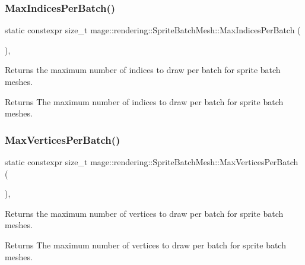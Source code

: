 \subsubsection{\texorpdfstring{Max\+Indices\+Per\+Batch()}{MaxIndicesPerBatch()}}
{\footnotesize\ttfamily static constexpr size\+\_\+t mage\+::rendering\+::\+Sprite\+Batch\+Mesh\+::\+Max\+Indices\+Per\+Batch (\begin{DoxyParamCaption}{ }\end{DoxyParamCaption})\hspace{0.3cm}{\ttfamily [static]}, {\ttfamily [noexcept]}}

Returns the maximum number of indices to draw per batch for sprite batch meshes.

\begin{DoxyReturn}{Returns}
The maximum number of indices to draw per batch for sprite batch meshes. 
\end{DoxyReturn}
\mbox{\label{classmage_1_1rendering_1_1_sprite_batch_mesh_adad10e43a3ac2fb393bb423ec71c69bf}} 
\subsubsection{\texorpdfstring{Max\+Vertices\+Per\+Batch()}{MaxVerticesPerBatch()}}
{\footnotesize\ttfamily static constexpr size\+\_\+t mage\+::rendering\+::\+Sprite\+Batch\+Mesh\+::\+Max\+Vertices\+Per\+Batch (\begin{DoxyParamCaption}{ }\end{DoxyParamCaption})\hspace{0.3cm}{\ttfamily [static]}, {\ttfamily [noexcept]}}

Returns the maximum number of vertices to draw per batch for sprite batch meshes.

\begin{DoxyReturn}{Returns}
The maximum number of vertices to draw per batch for sprite batch meshes. 
\end{DoxyReturn}
\mbox{\label{classmage_1_1rendering_1_1_sprite_batch_mesh_a19501a98accebf1a7ef53eb48980e750}} 

